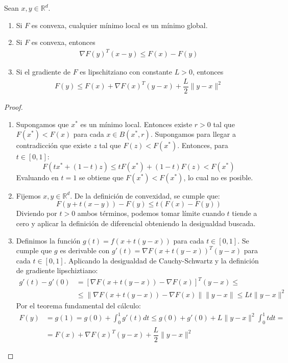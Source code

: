 \begin{lemma}
	\leavevmode
	Sean $x, y \in \mathbb{R}^d$.
	\begin{enumerate}
		\item Si $F$ es convexa, cualquier mínimo local es un mínimo global. 
		\item Si $F$ es convexa, entonces 
		\begin{align}\label{desig-convex}
			\nabla F(y)^T (x-y) \leq F(x) - F(y)
		\end{align}
		\item Si el gradiente de $F$ es lipschitziano con constante $L>0$, entonces 
		\begin{align}\label{desig-lips}
			F(y) \leq F(x) + \nabla F(x)^T(y-x) + \dfrac{L}{2} \| y-x\|^2
		\end{align}
	\end{enumerate}
\end{lemma}
\begin{proof}
	\leavevmode
	\begin{enumerate}
		\item Supongamos que $x^*$ es un mínimo local. Entonces existe $r>0$ tal que $F(x^*) < F(x)$ para cada $x \in B(x^*, r)$. Supongamos para llegar a contradicción que existe $z$ tal que $F(z)<F(x^*)$. Entonces, para $t \in [0,1]$:
		$$ F( tx^* + (1-t)z  ) \leq tF(x^*) + (1-t)F(z) < F(x^*) $$
		Evaluando en $t=1$ se obtiene que $F(x^*)<F(x^*)$, lo cual no es posible.
		\item Fijemos $x, y \in \mathbb{R}^d$. De la definición de convexidad, se cumple que:
		$$F(y + t(x-y)) - F(y) \leq t (F(x) - F(y)) $$
		Diviendo por $t>0$ ambos términos, podemos tomar límite cuando $t$ tiende a cero y aplicar la definición de diferencial obteniendo la desigualdad buscada.
		\item Definimos la función $g(t) = f(x + t(y-x))$ para cada $t \in [0,1]$. Se cumple que $g$ es derivable con $g'(t) = \nabla F(x + t(y-x))^T(y-x)$ para cada $t \in [0,1]$. Aplicando la desigualdad de Cauchy-Schwartz y la definición de gradiente lipschiztiano:
		\begin{align*}
			g'(t) - g'(0) & = \left[ \nabla F(x + t(y-x)) - \nabla F(x) \right]^T (y-x) \leq \\
			&\leq  \| \nabla F(x + t(y-x)) - \nabla F(x) \| \| y-x \| \leq L t \| y-x \|^2
	 	\end{align*}
 		Por el teorema fundamental del cálculo:
 		\begin{align*}
 			F(y) & = g(1) = g(0) + \int_{0}^{1}g'(t)dt \leq g(0) + g'(0) + L \| y-x \|^2 \int_{0}^{1}t dt= \\
 			& = F(x) + \nabla F(x)^T(y-x) + \dfrac{L}{2} \| y-x\|^2
 		\end{align*}
	\end{enumerate}
\end{proof}

